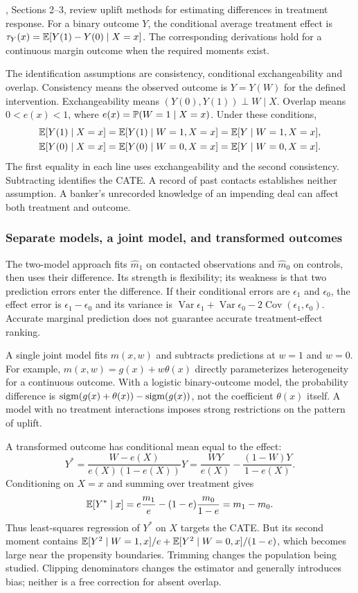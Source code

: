 \citet{gutierrez2017causal}, Sections 2--3, review uplift methods for estimating differences in treatment response. For a binary outcome $Y$, the conditional average treatment effect is $\tau_Y(x)=\mathbb{E}[Y(1)-Y(0)\mid X=x]$. The corresponding derivations hold for a continuous margin outcome when the required moments exist.

The identification assumptions are consistency, conditional exchangeability and overlap. Consistency means the observed outcome is $Y=Y(W)$ for the defined intervention. Exchangeability means $(Y(0),Y(1))\perp W\mid X$. Overlap means $0<e(x)<1$, where $e(x)=\mathbb{P}(W=1\mid X=x)$. Under these conditions,
\begin{align}
 \mathbb{E}[Y(1)\mid X=x]
 &=\mathbb{E}[Y(1)\mid W=1,X=x]=\mathbb{E}[Y\mid W=1,X=x],\\
 \mathbb{E}[Y(0)\mid X=x]
 &=\mathbb{E}[Y(0)\mid W=0,X=x]=\mathbb{E}[Y\mid W=0,X=x].
 \label{eq:uplift-identification}
\end{align}
The first equality in each line uses exchangeability and the second consistency. Subtracting identifies the CATE. A record of past contacts establishes neither assumption. A banker's unrecorded knowledge of an impending deal can affect both treatment and outcome.

\subsubsection{Separate models, a joint model, and transformed outcomes}

The two-model approach fits $\widehat m_1$ on contacted observations and $\widehat m_0$ on controls, then uses their difference. Its strength is flexibility; its weakness is that two prediction errors enter the difference. If their conditional errors are $\epsilon_1$ and $\epsilon_0$, the effect error is $\epsilon_1-\epsilon_0$ and its variance is $\operatorname{Var}\epsilon_1+\operatorname{Var}\epsilon_0-2\operatorname{Cov}(\epsilon_1,\epsilon_0)$. Accurate marginal prediction does not guarantee accurate treatment-effect ranking.

A single joint model fits $m(x,w)$ and subtracts predictions at $w=1$ and $w=0$. For example, $m(x,w)=g(x)+w\theta(x)$ directly parameterizes heterogeneity for a continuous outcome. With a logistic binary-outcome model, the probability difference is $\operatorname{sigm}(g(x)+\theta(x))-\operatorname{sigm}(g(x))$, not the coefficient $\theta(x)$ itself. A model with no treatment interactions imposes strong restrictions on the pattern of uplift.

A transformed outcome has conditional mean equal to the effect:
\begin{equation}
 Y^*=\frac{W-e(X)}{e(X)(1-e(X))}Y
     =\frac{WY}{e(X)}-\frac{(1-W)Y}{1-e(X)}.
 \label{eq:transformed-outcome}
\end{equation}
Conditioning on $X=x$ and summing over treatment gives
\[
 \mathbb{E}[Y^*\mid x]=e\frac{m_1}{e}-(1-e)\frac{m_0}{1-e}=m_1-m_0.
\]
Thus least-squares regression of $Y^*$ on $X$ targets the CATE. But its second moment contains $\mathbb{E}[Y^2\mid W=1,x]/e+\mathbb{E}[Y^2\mid W=0,x]/(1-e)$, which becomes large near the propensity boundaries. Trimming changes the population being studied. Clipping denominators changes the estimator and generally introduces bias; neither is a free correction for absent overlap.

